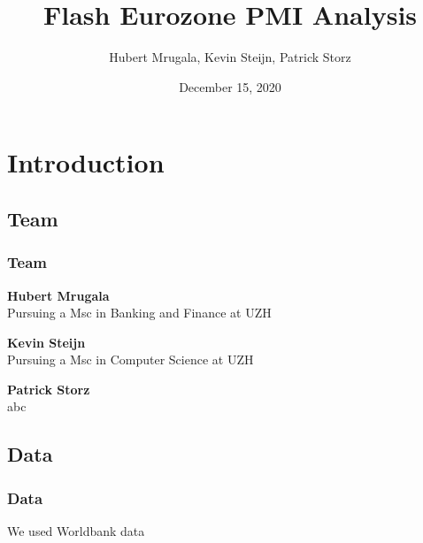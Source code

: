 \documentclass[10pt]{beamer}
\begin{document}
\title{Flash Eurozone PMI Analysis}
\author{Hubert Mrugala, Kevin Steijn, Patrick Storz}
\date{December 15, 2020}

\begin{frame}
\titlepage
\end{frame}
\section{Introduction}
\begin{frame}
\subsection{Team}
\frametitle{Team}

\textbf{Hubert Mrugala} \\
Pursuing a Msc in Banking and Finance at UZH

\vspace{3mm}

\textbf{Kevin Steijn} \\
Pursuing a Msc in Computer Science at UZH

\vspace{3mm}

\textbf{Patrick Storz} \\
abc
\end{frame}
\begin{frame}
\subsection{Data}
\frametitle{Data}

We used Worldbank data

\end{frame}
\end{document}
